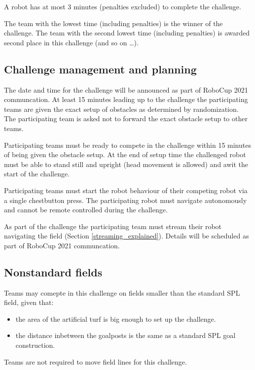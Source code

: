 A robot has at most 3 minutes (penalties excluded) to complete the challenge.

The team with the lowest time (including penalties) is the winner of the challenge. The team with the second lowest time (including penalties) is awarded second place in this challenge (and so on \ldots).

\subsection{Challenge management and planning}

The date and time for the challenge will be announced as part of RoboCup 2021 communcation. At least 15 minutes leading up to the challenge the participating teams are given the exact setup of obstacles as determined by randomization. The participating team is asked not to forward the exact obstacle setup to other teams.

Participating teams must be ready to compete in the challenge within 15 minutes of being given the obstacle setup. At the end of setup time the challenged robot must be able to stand still and upright (head movement is allowed) and awit the start of the challenge.

Participating teams must start the robot behaviour of their competing robot via a single chestbutton press. The participating robot must navigate autonomously and cannot be remote controlled during the challenge.

As part of the challenge the participating team must stream their robot navigating the field (\cf Section \ref{streaming_explained}). Details will be scheduled as part of RoboCup 2021 communcation.

\subsection{Nonstandard fields}

Teams may comepte in this challenge on fields smaller than the standard SPL field, given that:

\begin{itemize}
	\item the area of the artificial turf is big enough to set up the challenge.
	\item the distance inbetween the goalposts is the same as a standard SPL goal construction.
\end{itemize}

Teams are not required to move field lines for this challenge.

